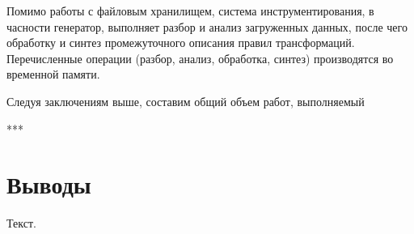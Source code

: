 Помимо работы с файловым хранилищем, система инструментирования, в часности генератор, выполняет разбор и анализ загруженных данных, после чего обработку и синтез промежуточного описания правил трансформаций.
Перечисленные операции (разбор, анализ, обработка, синтез) производятся во временной памяти.

Следуя заключениям выше, составим общий объем работ, выполняемый

***

\section{Выводы}

Текст.
